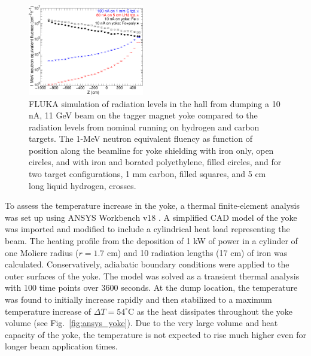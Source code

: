 \begin{figure}[hbt]
\begin{center}
\includegraphics[width=0.45\textwidth]{Radiation.pdf}
	\caption{FLUKA simulation of radiation levels in the hall from dumping a 10 nA, 11 GeV beam on the tagger magnet yoke compared to 
	the radiation levels from nominal running on hydrogen and carbon targets. The 1-MeV neutron equivalent fluency as function of position along the beamline for yoke shielding with iron only, open circles, and with iron and borated polyethylene, filled circles, and for two target configurations, 1 mm carbon, filled squares, and 5 cm long liquid hydrogen, crosses.}
\label{fig:raddem}
\end{center}
\end{figure}

To assess the temperature increase in the yoke, a thermal finite-element analysis was set up using ANSYS Workbench v18 \cite{ANSYS}. 
A simplified CAD model of the yoke was imported and modified to include a cylindrical heat load representing the beam. The heating 
profile from the deposition of 1 kW of power in a cylinder of one Moliere radius ($r = 1.7$ cm) and 10 radiation lengths (17 cm) of iron 
was calculated. Conservatively, adiabatic boundary conditions were applied to the outer surfaces of the yoke. The model was solved as 
a transient thermal analysis with 100 time points over 3600 seconds. At the dump location, the temperature was found to initially increase
rapidly and then stabilized to a maximum temperature increase of $\Delta T = 54^\circ$C as the heat dissipates throughout the yoke 
volume (see Fig.~\ref{fig:ansys_yoke}). Due to the very large volume and heat capacity of the yoke, the temperature is not expected to 
rise much higher even for longer beam application times.

